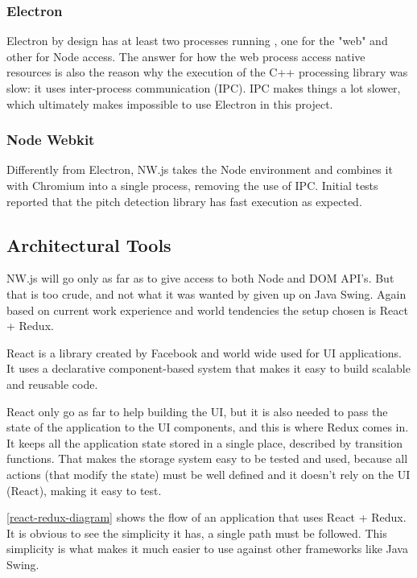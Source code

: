 \subsubsection{Electron}
Electron by design has at least two processes running \cite{ElectronVsNW},
one for the "web" and other
for Node access. The answer for how the web process access native resources is
also the reason why the execution of the C++ processing library was slow: it uses
inter-process communication (IPC). IPC makes things a lot slower, which ultimately
makes impossible to use Electron in this project.

\subsubsection{Node Webkit}
Differently from Electron, NW.js \cite{NWjs, ElectronVsNW} takes the Node environment
and combines it with Chromium into a single process, removing the use of IPC.
Initial tests reported that the pitch detection library has fast
execution as expected.

\subsection{Architectural Tools}
NW.js will go only as far as to give access to both Node and DOM API's. But that
is too crude, and not what it was wanted by given up on Java Swing. Again based on
current work experience and world tendencies the setup chosen is React + Redux. 

React \cite{React} is a library created by Facebook and world wide used for UI applications.
It uses a declarative component-based system that makes it easy to build scalable
and reusable code.

React only go as far to help building the UI, but it is also needed to pass the state
of the application to the UI components, and this is where Redux \cite{Redux} comes in.
It keeps all the application state stored in a single place, described by transition
functions. That makes the storage system easy to be tested and used, because all
actions (that modify the state) must be well defined and it doesn't rely on the
UI (React), making it easy to test.

\autoref{react-redux-diagram} shows the flow of an application that uses
React + Redux. It is obvious to see the simplicity it has, a single path must be followed.
This simplicity is what makes it much easier to use against other frameworks like
Java Swing. 

